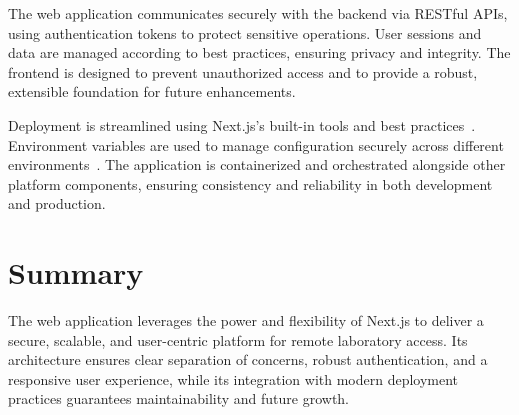 The web application communicates securely with the backend via RESTful APIs, using authentication tokens to protect sensitive operations. User sessions and data are managed according to best practices, ensuring privacy and integrity. The frontend is designed to prevent unauthorized access and to provide a robust, extensible foundation for future enhancements.

Deployment is streamlined using Next.js's built-in tools and best practices~\cite{nextjs-deployment}. Environment variables are used to manage configuration securely across different environments~\cite{nextjs-env-vars}. The application is containerized and orchestrated alongside other platform components, ensuring consistency and reliability in both development and production.

\section{Summary}

The web application leverages the power and flexibility of Next.js to deliver a secure, scalable, and user-centric platform for remote laboratory access. Its architecture ensures clear separation of concerns, robust authentication, and a responsive user experience, while its integration with modern deployment practices guarantees maintainability and future growth. 